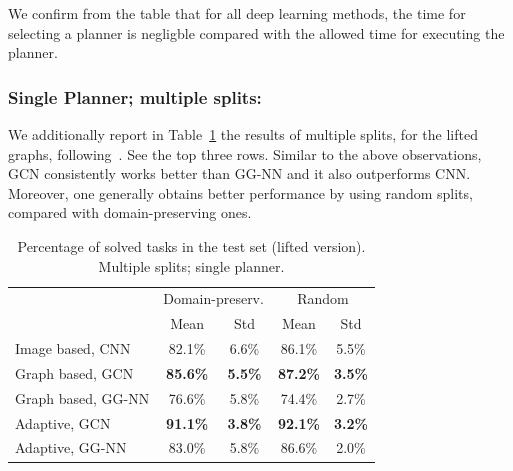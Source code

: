 \documentclass[letterpaper]{article} %
\begin{document}
We confirm from the table that for all deep learning methods, the time for selecting a planner is negligble compared with the allowed time for executing the planner.

\subsubsection{Single Planner; multiple splits:} We additionally report in Table~\ref{tab:perf.with.std} the results of multiple splits, for the lifted graphs, following~\cite{Sievers2019}. See the top three rows. Similar to the above observations, GCN consistently works better than GG-NN and it also outperforms CNN. Moreover, one generally obtains better performance by using random splits, compared with domain-preserving ones. 

%
%
%

\begin{table}[ht]
\centering
\caption{Percentage of solved tasks in the test set (lifted version). Multiple splits; single planner.}
\label{tab:perf.with.std}
\begin{tabular}{lcccc}
\hline
& \multicolumn{2}{c}{Domain-preserv.} &
\multicolumn{2}{c}{Random}\\
& Mean & Std & Mean & Std\\
\hline
Image based, CNN   & 82.1\% & 6.6\% & 86.1\% & 5.5\%\\
Graph based, GCN   & \textbf{85.6\%} & \textbf{5.5\%} & \textbf{87.2\%} & \textbf{3.5\%}\\
Graph based, GG-NN & 76.6\% & 5.8\% & 74.4\% & 2.7\%\\
\hline
Adaptive, GCN      & \textbf{91.1\%} & \textbf{3.8\%} & \textbf{92.1\%} & \textbf{3.2\%}\\
Adaptive, GG-NN    & 83.0\% & 5.8\% & 86.6\% & 2.0\%\\
\hline
\end{tabular}
\end{table}
\end{document}
